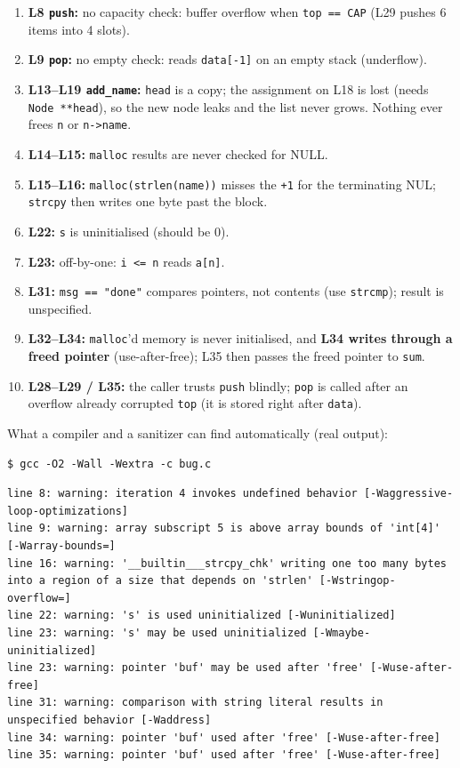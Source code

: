 \documentclass[10pt,a4paper,openany,oneside]{report}
\begin{document}
\begin{exbox}
\begin{enumerate}[nosep]
\item \textbf{L8 \texttt{push}:} no capacity check: buffer overflow when \texttt{top == CAP} (L29 pushes 6 items into 4 slots).
\item \textbf{L9 \texttt{pop}:} no empty check: reads \texttt{data[-1]} on an empty stack (underflow).
\item \textbf{L13--L19 \texttt{add\_name}:} \texttt{head} is a copy; the assignment on L18 is lost (needs \texttt{Node **head}), so the new node leaks and the list never grows. Nothing ever frees \texttt{n} or \texttt{n->name}.
\item \textbf{L14--L15:} \texttt{malloc} results are never checked for NULL.
\item \textbf{L15--L16:} \texttt{malloc(strlen(name))} misses the \texttt{+1} for the terminating NUL; \texttt{strcpy} then writes one byte past the block.
\item \textbf{L22:} \texttt{s} is uninitialised (should be 0).
\item \textbf{L23:} off-by-one: \texttt{i <= n} reads \texttt{a[n]}.
\item \textbf{L31:} \texttt{msg == "done"} compares pointers, not contents (use \texttt{strcmp}); result is unspecified.
\item \textbf{L32--L34:} \texttt{malloc}'d memory is never initialised, and \textbf{L34 writes through a freed pointer} (use-after-free); L35 then passes the freed pointer to \texttt{sum}.
\item \textbf{L28--L29 / L35:} the caller trusts \texttt{push} blindly; \texttt{pop} is called after an overflow already corrupted \texttt{top} (it is stored right after \texttt{data}).
\end{enumerate}
\end{exbox}
What a compiler and a sanitizer can find automatically (real output):
\begin{lstlisting}[style=shcmd]
$ gcc -O2 -Wall -Wextra -c bug.c
\end{lstlisting}
\begin{lstlisting}[style=out]
line 8: warning: iteration 4 invokes undefined behavior [-Waggressive-loop-optimizations]
line 9: warning: array subscript 5 is above array bounds of 'int[4]' [-Warray-bounds=]
line 16: warning: '__builtin___strcpy_chk' writing one too many bytes into a region of a size that depends on 'strlen' [-Wstringop-overflow=]
line 22: warning: 's' is used uninitialized [-Wuninitialized]
line 23: warning: 's' may be used uninitialized [-Wmaybe-uninitialized]
line 23: warning: pointer 'buf' may be used after 'free' [-Wuse-after-free]
line 31: warning: comparison with string literal results in unspecified behavior [-Waddress]
line 34: warning: pointer 'buf' used after 'free' [-Wuse-after-free]
line 35: warning: pointer 'buf' used after 'free' [-Wuse-after-free]
\end{lstlisting}
\end{document}
